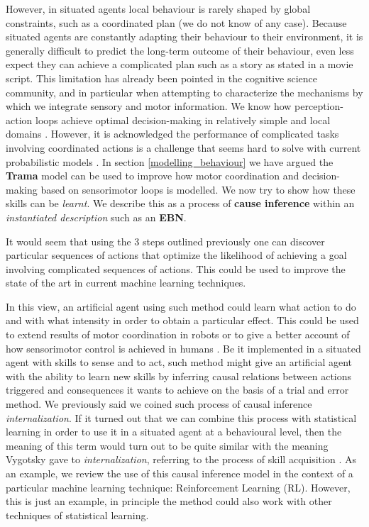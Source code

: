 \documentclass[
		twoside,openright,titlepage,numbers=noenddot,manychapters,
		headinclude,%
                footinclude=false,cleardoublepage=empty,
                BCOR=5mm,
		fontsize=11pt, %
                 enabledeprecatedfontcommands]{scrreprt}
\begin{document}
 However, in situated agents  local behaviour is rarely shaped by global constraints, such as a coordinated plan (we do not know of any case). Because situated agents are constantly adapting their behaviour to their environment, it is generally difficult to predict the long-term outcome of their behaviour, even less expect they can achieve a complicated plan such as a story as stated in a movie script. This limitation has already been pointed in the cognitive science community, and in particular when attempting to characterize the mechanisms by which we integrate sensory and motor information. We know how perception-action loops achieve optimal decision-making in relatively simple and local domains \cite[]{Kording2004,kober2009policy}. 
However, it is acknowledged the performance of complicated tasks involving coordinated actions is a challenge that seems hard to solve with current probabilistic models \cite[]{wolpert2007probabilistic}. In section \ref{modelling_behaviour} we have argued the \textbf{Trama} model can be used to improve  how motor coordination and decision-making based on sensorimotor loops is modelled. We now try to show how these skills can be \emph{learnt}. We describe this as a process of \textbf{cause inference}  within an \emph{instantiated description} such as an \textbf{EBN}.

It would seem that using the 3 steps outlined previously one can discover particular sequences of actions that optimize the likelihood of achieving a goal involving complicated sequences of actions. This could be used to improve the state of the art in current machine learning techniques.

 In this view, an artificial agent using such method could learn what action to do and with what intensity in order to obtain a particular effect. This could be used to extend results of motor coordination in robots \cite[]{kober2009policy} or to give a better account of how sensorimotor control is achieved in humans \cite[]{Kording2004}.  Be it implemented in a situated agent with skills to sense and to act, such method might give an artificial agent with the ability to learn new skills by inferring causal relations between actions triggered and consequences it wants to achieve on the basis of a trial and error method. We previously said we coined such process of causal inference \emph{internalization}. If it turned out that we can combine this process with statistical learning in order to use it in a situated agent at a behavioural level, then the meaning of this term would turn out to be quite similar with the meaning Vygotsky gave to \emph{internalization}, referring to the process of skill acquisition \cite[]{vygotsky1964tal,vygotsky1978mind}. 
As an example, we review the use of this causal inference model in the context of a particular machine learning technique: Reinforcement Learning (RL). However, this is just an example, in principle the method could also work with other  techniques of statistical learning.
\end{document}
